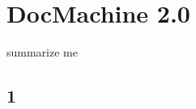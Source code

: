 \chapter{DocMachine 2.0}
\label{sec:docmachine}

\begin{summary}
summarize me
\end{summary}

\section{1}
\label{sec:docmachine:1}


